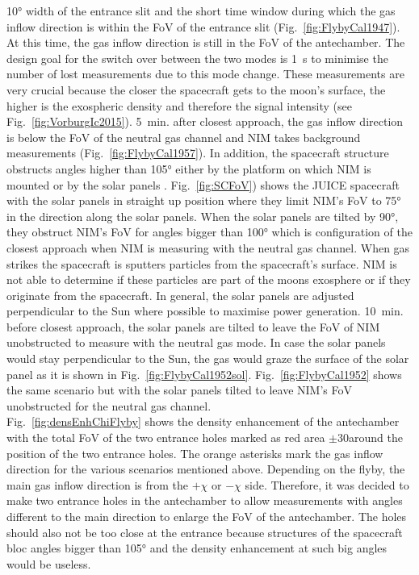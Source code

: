 	10° width of the entrance slit and the short time window during which the gas inflow direction is within the FoV of the entrance slit (Fig.~\ref{fig:FlybyCal1947}). At this time, the gas inflow direction is still in the FoV of the antechamber. The design goal for the switch over between the two modes is 1~s to minimise the number of lost measurements due to this mode change. These measurements are very crucial because the closer the spacecraft gets to the moon's surface, the higher is the exospheric density and therefore the signal intensity (see Fig.~\ref{fig:VorburgIc2015}). 5~min. after closest approach, the gas inflow direction is below the FoV of the neutral gas channel and NIM takes background measurements (Fig.~\ref{fig:FlybyCal1957}). In addition, the spacecraft structure obstructs angles higher than 105° either by the platform on which NIM is mounted or by the solar panels \cite{NIM_FoV}. Fig.~\ref{fig:SCFoV}) shows the JUICE spacecraft with the solar panels in straight up position where they limit NIM's FoV to 75° in the direction along the solar panels. When the solar panels are tilted by 90°, they obstruct NIM's FoV for angles bigger than 100° which is configuration of the closest approach when NIM is measuring with the neutral gas channel. When gas strikes the spacecraft is sputters particles from the spacecraft's surface. NIM is not able to determine if these particles are part of the moons exosphere or if they originate from the spacecraft. In general, the solar panels are adjusted perpendicular to the Sun where possible to maximise power generation. 10~min. before closest approach, the solar panels are tilted to leave the FoV of NIM unobstructed to measure with the neutral gas mode. In case the solar panels would stay perpendicular to the Sun, the gas would graze the surface of the solar panel as it is shown in Fig.~\ref{fig:FlybyCal1952sol}. Fig.~\ref{fig:FlybyCal1952} shows the same scenario but with the solar panels tilted to leave NIM's FoV unobstructed for the neutral gas channel.\\
	Fig.~\ref{fig:densEnhChiFlyby} shows the density enhancement of the antechamber with the total FoV of the two entrance holes marked as red area $\pm$30\degree around the position of the two entrance holes. The orange asterisks mark the gas inflow direction for the various scenarios mentioned above. Depending on the flyby, the main gas inflow direction is from the $+\chi$ or $-\chi$ side. Therefore, it was decided to make two entrance holes in the antechamber to allow measurements with angles different to the main direction to enlarge the FoV of the antechamber. The holes should also not be too close at the entrance because structures of the spacecraft bloc angles bigger than 105° and the density enhancement at such big angles would be useless.\\
